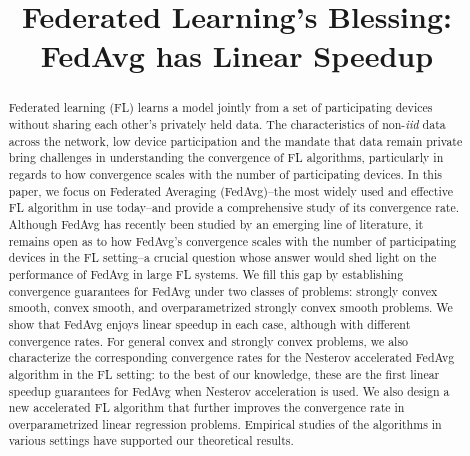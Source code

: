 \documentclass{article}
\title{Federated Learning's Blessing:\\
FedAvg has Linear Speedup}
\author{}
\begin{document}
\maketitle

\begin{abstract}
Federated learning (FL) learns a model jointly from a set of participating devices without sharing each other's privately held data. The characteristics of non-\textit{iid} data across the network, low device participation and the mandate that data remain private bring challenges in understanding the convergence of FL algorithms, particularly in regards to how convergence scales with the number of participating devices. In this paper, we focus on Federated Averaging (FedAvg)--the most widely used and effective FL algorithm in use today--and provide a comprehensive study of its convergence rate. Although FedAvg has recently been studied by an emerging line of literature, it remains open as to how FedAvg's convergence scales with the number of participating devices in the FL setting--a crucial question whose answer would shed light on the performance of FedAvg in large FL systems. We fill this gap by establishing convergence guarantees for FedAvg under two classes of problems: strongly convex smooth, convex smooth, and overparametrized strongly convex smooth problems. We show that FedAvg enjoys linear speedup in each case, although with different convergence rates. For general convex and strongly convex problems, we also characterize the corresponding convergence rates for the Nesterov accelerated FedAvg algorithm in the FL setting: to the best of our knowledge, these are the first linear speedup guarantees for FedAvg when Nesterov acceleration is used. We also design a new accelerated FL algorithm that further improves the convergence rate in overparametrized linear regression problems. 
Empirical studies of the algorithms in various settings have supported our theoretical results.
\end{abstract}


%






% 


\newpage




\newpage
\appendix

\end{document}
